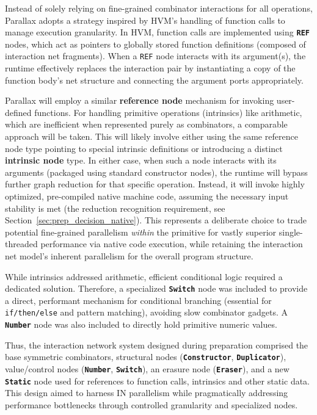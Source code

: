Instead of solely relying on fine-grained combinator interactions for all operations, Parallax adopts a strategy inspired by HVM's handling of function calls \cite{HVMGithub} to manage execution granularity. In HVM, function calls are implemented using \textbf{\texttt{REF}} nodes, which act as pointers to globally stored function definitions (composed of interaction net fragments). When a \texttt{REF} node interacts with its argument(s), the runtime effectively replaces the interaction pair by instantiating a copy of the function body's net structure and connecting the argument ports appropriately. 

Parallax will employ a similar \textbf{reference node} mechanism for invoking user-defined functions. For handling primitive operations (intrinsics) like arithmetic, which are inefficient when represented purely as combinators, a comparable approach will be taken. This will likely involve either using the same reference node type pointing to special intrinsic definitions or introducing a distinct \textbf{intrinsic node} type. In either case, when such a node interacts with its arguments (packaged using standard constructor nodes), the runtime will bypass further graph reduction for that specific operation. Instead, it will invoke highly optimized, pre-compiled native machine code, assuming the necessary input stability is met (the reduction recognition requirement, see Section~\ref{sec:prep_decision_native}). This represents a deliberate choice to trade potential fine-grained parallelism \textit{within} the primitive for vastly superior single-threaded performance via native code execution, while retaining the interaction net model's inherent parallelism for the overall program structure.

While intrinsics addressed arithmetic, efficient conditional logic required a dedicated solution. Therefore, a specialized \textbf{\texttt{Switch}} node was included to provide a direct, performant mechanism for conditional branching (essential for \texttt{if/then/else} and pattern matching), avoiding slow combinator gadgets. A \textbf{\texttt{Number}} node was also included to directly hold primitive numeric values.

Thus, the interaction network system designed during preparation comprised the base symmetric combinators, structural nodes (\textbf{\texttt{Constructor}}, \textbf{\texttt{Duplicator}}), value/control nodes (\textbf{\texttt{Number}}, \textbf{\texttt{Switch}}), an erasure node (\textbf{\texttt{Eraser}}), and a new \textbf{\texttt{Static}} node used for references to function calls, intrinsics and other static data. This design aimed to harness IN parallelism while pragmatically addressing performance bottlenecks through controlled granularity and specialized nodes.

